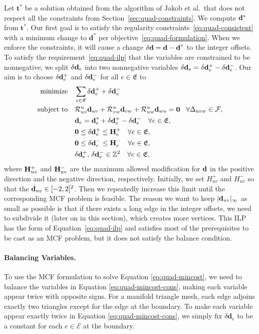 Let ${\textbf{t}}^*$ be a solution obtained from the algorithm of Jakob et al.\ that does not respect all the constraints from Section~\ref{sec:quad-constraints}. We compute ${\mathbf{d}}^*$ from ${\textbf{t}}^*$. Our first goal is to satisfy the regularity constraints~\eqref{eq:quad-consistent} with a minimum change to ${\textbf{d}}^*$ per objective~\eqref{eq:quad-formulation}. When we enforce the constraints, it will cause a change $\delta \mathbf{d}={\textbf{d}}-{\textbf{d}}^*$ to the integer offsets. To satisfy the requirement~\eqref{eq:quad-ilp} that the variables are constrained to be nonnegative, we split $\delta \mathbf{d}_e$ into two nonnegative variables $\delta \mathbf{d}_e = \delta \mathbf{d}^+_e - \delta \mathbf{d}^-_e$.  Our aim is to choose $\delta \mathbf{d}^+_e$ and $\delta \mathbf{d}^-_e$ for all $e \in \mathfrak{E}$ to
\begin{align}
\operatorname*{minimize} \quad & \sum_{e \in \mathfrak{E}} \delta\mathbf{d}^+_e+\delta\mathbf{d}^-_e\label{eq:quad-mincost}\\
\text{subject to} \quad & \mathcal{R}^u_{uv}{\textbf{d}}_{uv}+\mathcal{R}^u_{vw}{\textbf{d}}_{vw}+\mathcal{R}^u_{uw}{\textbf{d}}_{wu}=\textbf{0} \;\;\;\forall \Delta_{uvw} \in \mathcal{F}, \label{eq:quad-mincost-cons} \\
& {\mathbf{d}}_e = {\textbf{d}}^*_e +\delta \mathbf{d}^+_e - \delta \mathbf{d}^-_e \quad\forall e \in \mathfrak{E}, \notag \\
& \mathbf{0} \le \delta \mathbf{d}^+_{e} \le \mathbf{H}_{e}^+  \quad \forall e \in \mathfrak{E}, \notag \\
& \mathbf{0} \le \delta \mathbf{d}^-_{e} \le \mathbf{H}_{e}^-  \quad \forall e \in \mathfrak{E}, \notag \\
&       \delta \mathbf{d}^+_e, \, \delta \mathbf{d}^-_e \in \mathbb{Z}^2 \quad \forall e \in \mathfrak{E}, \notag
\end{align}
where $\mathbf{H}_{uv}^+$ and $\mathbf{H}_{uv}^-$ are the maximum allowed modification for ${\mathbf{d}}$ in the positive direction and the negative direction, respectively.  Initially, we set $H^+_{uv}$ and $H^-_{uv}$ so that the $\mathbf{d}_{uv} \in [-2,2]^2$. Then we repeatedly increase this limit until the corresponding MCF problem is feasible. The reason we want to keep $|\mathbf{d}_{uv}|_\infty$ as small as possible is that if there exists a long edge in the integer offsets, we need to subdivide it (later on in this section), which creates more vertices.  This ILP has the form of Equation~\eqref{eq:quad-ilp} and satisfies most of the prerequisites to be cast as an MCF problem, but it does not satisfy the balance condition.

\paragraph*{Balancing Variables.}
To use the MCF formulation to solve Equation \eqref{eq:quad-mincost}, we need to balance the variables in Equation \eqref{eq:quad-mincost-cons},  making each variable appear twice with opposite signs.  For a manifold triangle mesh, each edge adjoins exactly two triangles except for the edge at the boundary. To make each variable appear exactly twice in Equation \eqref{eq:quad-mincost-cons}, we simply fix $\delta{\textbf{d}}_{e}$ to be a constant for each $e \in \mathcal{E}$ at the boundary.

